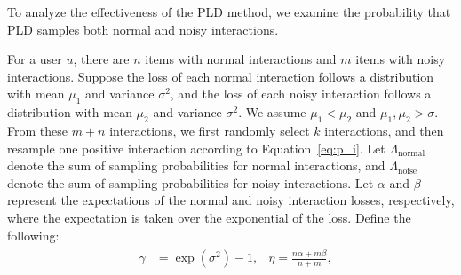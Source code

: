 To analyze the effectiveness of the PLD method, we examine the probability that PLD samples both normal and noisy interactions.
\begin{theorem}
\label{the:p_i_j}
    For a user \( u \), there are \( n \) items with normal interactions and \( m \) items with noisy interactions. 
    Suppose the loss of each normal interaction follows a distribution with mean \(\mu_1\) and variance \(\sigma^2\), and the loss of each noisy interaction follows a distribution with mean \(\mu_2\) and variance \(\sigma^2\). We assume \(\mu_1 < \mu_2\) and \(\mu_1, \mu_2 > \sigma\). From these \( m+n \) interactions, we first randomly select $k$ interactions, and then resample one positive interaction according to Equation~\ref{eq:p_i}. Let \( \Lambda_{\text{normal}} \) denote the sum of sampling probabilities for normal interactions, and \( \Lambda_{\text{noise}} \) denote the sum of sampling probabilities for noisy interactions. 
    Let \(\alpha\) and \(\beta\) represent the expectations of the normal and noisy interaction losses, respectively, where the expectation is taken over the exponential of the loss. Define the following:
    \begin{equation*}
        \begin{aligned}
            & \begin{aligned}
                \gamma &= \exp(\sigma^2) - 1, 
                 &\eta = \frac{n\alpha + m\beta}{n+m},\\
            \end{aligned}\\

\end{aligned}
\end{equation*}
\end{theorem}
